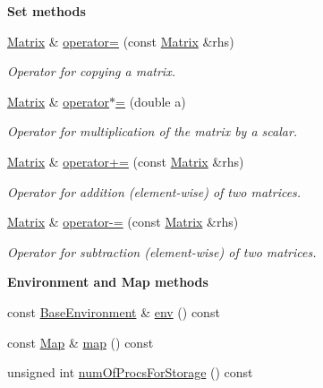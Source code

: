 \begin{Indent}{\bf Set methods}\par
\begin{DoxyCompactItemize}
\item 
\hyperlink{class_q_u_e_s_o_1_1_matrix}{Matrix} \& \hyperlink{class_q_u_e_s_o_1_1_matrix_a21eedb3302f3d41fbd783b363a8ccc71}{operator=} (const \hyperlink{class_q_u_e_s_o_1_1_matrix}{Matrix} \&rhs)
\begin{DoxyCompactList}\small\item\em Operator for copying a matrix. \end{DoxyCompactList}\item 
\hyperlink{class_q_u_e_s_o_1_1_matrix}{Matrix} \& \hyperlink{class_q_u_e_s_o_1_1_matrix_a29f5f8eec8bdd1dbdf215d5581686776}{operator$\ast$=} (double a)
\begin{DoxyCompactList}\small\item\em Operator for multiplication of the matrix by a scalar. \end{DoxyCompactList}\item 
\hyperlink{class_q_u_e_s_o_1_1_matrix}{Matrix} \& \hyperlink{class_q_u_e_s_o_1_1_matrix_a90e47c0d81a0e7e7a2edb7784e3ba680}{operator+=} (const \hyperlink{class_q_u_e_s_o_1_1_matrix}{Matrix} \&rhs)
\begin{DoxyCompactList}\small\item\em Operator for addition (element-\/wise) of two matrices. \end{DoxyCompactList}\item 
\hyperlink{class_q_u_e_s_o_1_1_matrix}{Matrix} \& \hyperlink{class_q_u_e_s_o_1_1_matrix_a8b8f5a2950d31cd52108869a81cbc508}{operator-\/=} (const \hyperlink{class_q_u_e_s_o_1_1_matrix}{Matrix} \&rhs)
\begin{DoxyCompactList}\small\item\em Operator for subtraction (element-\/wise) of two matrices. \end{DoxyCompactList}\end{DoxyCompactItemize}
\end{Indent}
\begin{Indent}{\bf Environment and Map methods}\par
\begin{DoxyCompactItemize}
\item 
const \hyperlink{class_q_u_e_s_o_1_1_base_environment}{Base\-Environment} \& \hyperlink{class_q_u_e_s_o_1_1_matrix_a1eefeca9f35200e8275fb0fdfa0c8684}{env} () const 
\item 
const \hyperlink{class_q_u_e_s_o_1_1_map}{Map} \& \hyperlink{class_q_u_e_s_o_1_1_matrix_ae01c72255466cd95201bb4c7f07e1b83}{map} () const 
\item 
unsigned int \hyperlink{class_q_u_e_s_o_1_1_matrix_a7d7310149ecf33ca68c5ef7a815093db}{num\-Of\-Procs\-For\-Storage} () const 
\end{DoxyCompactItemize}
\end{Indent}
